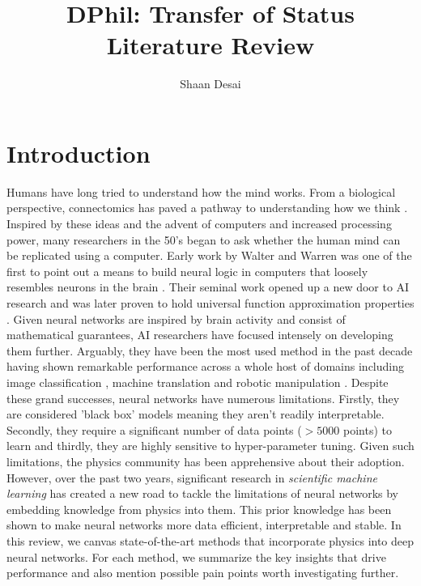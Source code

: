 \documentclass{article}
\title{DPhil: Transfer of Status Literature Review}
\author{Shaan Desai }
\begin{document}
\maketitle

\pagebreak
\tableofcontents
\pagebreak
\section{Introduction}

Humans have long tried to understand how the mind works. From a biological perspective, connectomics has paved a pathway to understanding how we think \cite{cowan_neural_1990}. Inspired by these ideas and the advent of computers and increased processing power, many researchers in the 50's began to ask whether the human mind can be replicated using a computer. Early work by Walter and Warren was one of the first to point out a means to build neural logic in computers that loosely resembles neurons in the brain \cite{cowan_neural_1990}. Their seminal work opened up a new door to AI research and was later proven to hold universal function approximation properties \cite{hornik_multilayer_1989}. Given neural networks are inspired by brain activity and consist of mathematical guarantees, AI researchers have focused intensely on developing them further. Arguably, they have been the most used method in the past decade having shown remarkable performance across a whole host of domains including image classification \cite{he_mask_2018}, machine translation \cite{devlin_bert_2019} and robotic manipulation \cite{toussaint_differentiable_2018}. Despite these grand successes, neural networks have numerous limitations. Firstly, they are considered 'black box' models meaning they aren't readily interpretable. Secondly, they require a significant number of data points ($>5000$ points) to learn and thirdly, they are highly sensitive to hyper-parameter tuning. Given such limitations, the physics community has been apprehensive about their adoption. However, over the past two years, significant research in \textit{scientific machine learning} has created a new road to tackle the limitations of neural networks by embedding knowledge from physics into them. This prior knowledge has been shown to make neural networks more data efficient, interpretable and stable. In this review, we canvas state-of-the-art methods that incorporate physics into deep neural networks. For each method, we summarize the key insights that drive performance and also mention possible pain points worth investigating further.
\end{document}

